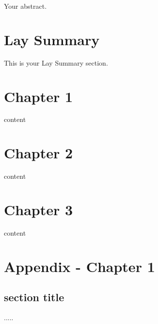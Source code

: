 \documentclass[12pt]{report}
\begin{document}
Your abstract.


\newpage
\chapter*{Lay Summary}

This is your Lay Summary section.



\newpage


\tableofcontents




\newpage




\listoffigures

\newpage

\listoftables


\newpage

\chapter[Chapter 1]{Chapter 1\raisebox{.3\baselineskip}{\normalsize\footnotemark}}

content

\chapter[Chapter 2]{Chapter 2\raisebox{.3\baselineskip}{\normalsize\footnotemark}}

content

\chapter[Chapter 3]{Chapter 3\raisebox{.3\baselineskip}{\normalsize\footnotemark}}

content


\clearpage
%


\pagebreak
\appendix

\chapter{Appendix - Chapter 1}

\setcounter{table}{0}
\renewcommand{\thetable}{A\arabic{table}}


\renewcommand{\thefigure}{A\arabic{figure}}

\setcounter{figure}{0}



\section{section title}
\label{appdix-define-labour-outcome}

.....
\end{document}
